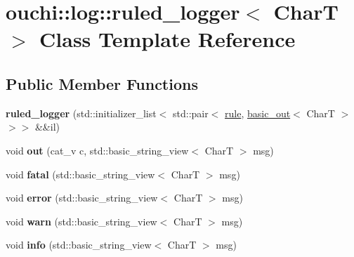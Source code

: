 \hypertarget{classouchi_1_1log_1_1ruled__logger}{}\section{ouchi\+::log\+::ruled\+\_\+logger$<$ CharT $>$ Class Template Reference}
\label{classouchi_1_1log_1_1ruled__logger}
\subsection*{Public Member Functions}
\begin{DoxyCompactItemize}
\item 
\mbox{\label{classouchi_1_1log_1_1ruled__logger_aa809defd369793587d0f2fc770667706}} 
{\bfseries ruled\+\_\+logger} (std\+::initializer\+\_\+list$<$ std\+::pair$<$ \mbox{\hyperlink{structouchi_1_1log_1_1rule}{rule}}, \mbox{\hyperlink{classouchi_1_1log_1_1basic__out}{basic\+\_\+out}}$<$ CharT $>$$>$$>$ \&\&il)
\item 
\mbox{\label{classouchi_1_1log_1_1ruled__logger_a758033cc665a9b31981909c216449ff2}} 
void {\bfseries out} (cat\+\_\+v c, std\+::basic\+\_\+string\+\_\+view$<$ CharT $>$ msg)
\item 
\mbox{\label{classouchi_1_1log_1_1ruled__logger_ad1b47e4b04663da5da635993f421829a}} 
void {\bfseries fatal} (std\+::basic\+\_\+string\+\_\+view$<$ CharT $>$ msg)
\item 
\mbox{\label{classouchi_1_1log_1_1ruled__logger_ae2f5806ebf9382d7d28411e5f75c1cba}} 
void {\bfseries error} (std\+::basic\+\_\+string\+\_\+view$<$ CharT $>$ msg)
\item 
\mbox{\label{classouchi_1_1log_1_1ruled__logger_abab580aeb70ab8104445ef1fe51a1692}} 
void {\bfseries warn} (std\+::basic\+\_\+string\+\_\+view$<$ CharT $>$ msg)
\item 
\mbox{\label{classouchi_1_1log_1_1ruled__logger_a87df3535566398d1f2ac89319b3c741d}} 
void {\bfseries info} (std\+::basic\+\_\+string\+\_\+view$<$ CharT $>$ msg)
\item 

\end{DoxyCompactItemize}
